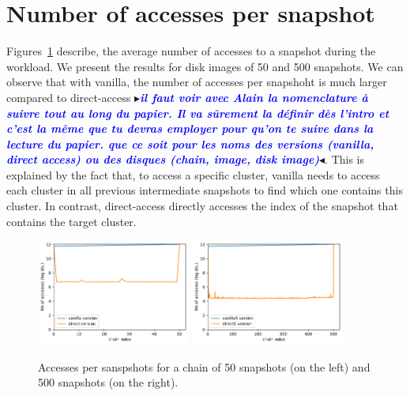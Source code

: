 \documentclass[sigplan,screen,10pt]{acmart}
\newcommand{\mynote}[2]{\fbox{\bfseries\sffamily\footnotesize{\textbf{#1}}}
 {\small$\blacktriangleright$\textsf{\emph{#2}}$\blacktriangleleft$}}
\newcommand{\mynote}[2]{}
\newcommand{\stella}[1]{\mynote{\textcolor{red}{Stella}}{\textcolor{blue}{\textbf{#1}}}}
\begin{document}
	\section*{Number of accesses per snapshot}
	
	Figures~\ref{fig:fig2} describe, the average number of accesses to a snapshot during the workload.
	We present the results for disk images of 50 and 500 snapshots.
	We can observe that with vanilla, the number of accesses per snapshoht is much larger compared to direct-access \stella{il faut voir avec Alain la nomenclature à suivre tout au long du papier. Il va sûrement la définir dès l'intro et c'est la même que tu devras employer pour qu'on te suive dans la lecture du papier. que ce soit pour les noms des versions (vanilla, direct access) ou des disques (chain, image, disk image)}.
	This is explained by the fact that, to access a specific cluster, vanilla needs to access each cluster in all previous intermediate snapshots to find which one contains this cluster.
	In contrast, direct-access directly accesses the index of the snapshot that contains the target cluster.
	
	\begin{figure}[h]
		\center
		\includegraphics[width=0.45\textwidth]{clusters_accesses_chain_50.pdf}
		\includegraphics[width=0.45\textwidth]{clusters_accesses_chain_500.pdf}
		\caption{Accesses per sanspshots for a chain of 50 snapshots (on the left) and 500 snapshots (on the right).}
		\label{fig:fig2}
	\end{figure}
\end{document}
